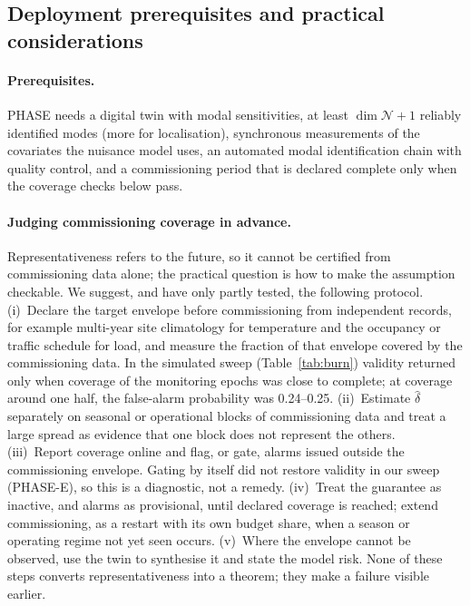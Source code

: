 \documentclass[12pt,a4paper]{article}
\newenvironment{revblock}{}{}
\newenvironment{revblock}{\begingroup\color{revcol}}{\endgroup}
\begin{document}
\begin{revblock}
\subsection{Deployment prerequisites and practical considerations}\label{sec:deploy}

\paragraph{Prerequisites.} PHASE needs a digital twin with modal sensitivities, at least $\dim\mathcal N+1$ reliably identified modes (more for localisation), synchronous measurements of the covariates the nuisance model uses, an automated modal identification chain with quality control, and a commissioning period that is declared complete only when the coverage checks below pass.

\paragraph{Judging commissioning coverage in advance.} Representativeness refers to the future, so it cannot be certified from commissioning data alone; the practical question is how to make the assumption checkable. We suggest, and have only partly tested, the following protocol. (i)~Declare the target envelope before commissioning from independent records, for example multi-year site climatology for temperature and the occupancy or traffic schedule for load, and measure the fraction of that envelope covered by the commissioning data. In the simulated sweep (Table~\ref{tab:burn}) validity returned only when coverage of the monitoring epochs was close to complete; at coverage around one half, the false-alarm probability was 0.24--0.25. (ii)~Estimate $\hat\delta$ separately on seasonal or operational blocks of commissioning data and treat a large spread as evidence that one block does not represent the others. (iii)~Report coverage online and flag, or gate, alarms issued outside the commissioning envelope. Gating by itself did not restore validity in our sweep (PHASE-E), so this is a diagnostic, not a remedy. (iv)~Treat the guarantee as inactive, and alarms as provisional, until declared coverage is reached; extend commissioning, as a restart with its own budget share, when a season or operating regime not yet seen occurs. (v)~Where the envelope cannot be observed, use the twin to synthesise it and state the model risk. None of these steps converts representativeness into a theorem; they make a failure visible earlier.


\end{revblock}
\end{document}
